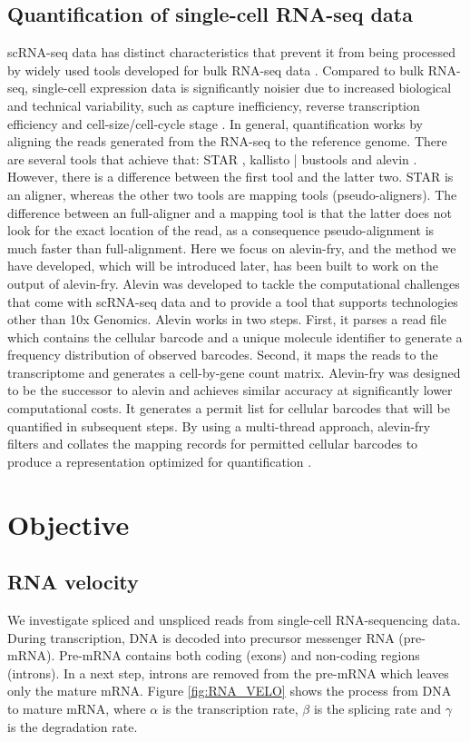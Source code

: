 \subsection{Quantification of single-cell RNA-seq data}
scRNA-seq data has distinct characteristics that prevent it from being processed by widely used tools developed for bulk RNA-seq data \citep{alevin_fry}. Compared to bulk RNA-seq, single-cell expression data is significantly noisier due to increased biological and technical variability, such as capture inefficiency, reverse transcription efficiency and cell-size/cell-cycle stage \citep{scrna_seq}. In general, quantification works by aligning the reads generated from the RNA-seq to the reference genome. There are several tools that achieve that: STAR \citep{star}, kallisto | bustools \citep{kallisto} and alevin \citep{alevin}. However, there is a difference between the first tool and the latter two. STAR is an aligner, whereas the other two tools are mapping tools (pseudo-aligners). The difference between an full-aligner and a mapping tool is that the latter does not look for the exact location of the read, as a consequence pseudo-alignment is much faster than full-alignment. Here we focus on alevin-fry, and the method we have developed, which will be introduced later, has been built to work on the output of alevin-fry. Alevin was developed to tackle the computational challenges that come with scRNA-seq data and to provide a tool that supports technologies other than 10x Genomics. Alevin works in two steps. First, it parses a read file which contains the cellular barcode and a unique molecule identifier to generate a frequency distribution of observed barcodes. Second, it maps the reads to the transcriptome and generates a cell-by-gene count matrix. Alevin-fry \citep{alevin_fry} was designed to be the successor to alevin and achieves similar accuracy at significantly lower computational costs. It generates a permit list for cellular barcodes that will be quantified in subsequent steps. By using a multi-thread approach, alevin-fry filters and collates the mapping records for permitted cellular barcodes to produce a representation optimized for quantification \citep{alevin_fry}.

\section{Objective}

\subsection{RNA velocity}
We investigate spliced and unspliced reads from single-cell RNA-sequencing data. During transcription, DNA is decoded into precursor messenger RNA (pre-mRNA). Pre-mRNA contains both coding (exons) and non-coding regions (introns). In a next step, introns are removed from the pre-mRNA which leaves only the mature mRNA. Figure \ref{fig:RNA_VELO} shows the process from DNA to mature mRNA, where $\alpha$ is the transcription rate, $\beta$ is the splicing rate and $\gamma$ is the degradation rate.

